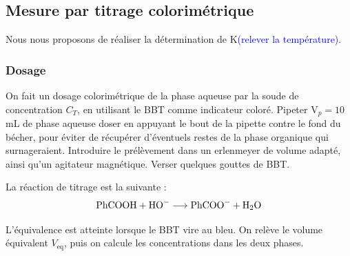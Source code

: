 \documentclass[11pt,a4paper]{report}
\begin{document}
\subsection{Mesure par titrage colorimétrique}

Nous nous proposons de réaliser la détermination de K\degree \textcolor{blue}{(relever la température)}.

\subsubsection*{Dosage}

On fait un dosage colorimétrique de la phase aqueuse par la soude de concentration $C_T$, en utilisant le BBT comme indicateur coloré. Pipeter $\text{V}_p = 10$ mL de phase aqueuse doser en appuyant le bout de la pipette contre le fond du bécher, pour éviter de récupérer d'éventuels restes de la phase organique qui surnageraient. Introduire le prélèvement dans un erlenmeyer de volume adapté, ainsi qu'un agitateur magnétique. Verser quelques gouttes de BBT.

La réaction de titrage est la suivante :
\begin{equation}
	\text{\text{PhCOOH}} + \text{HO}^- \longrightarrow \text{PhCOO}^- + \text{H}_2\text{O}
\end{equation}

L'équivalence est atteinte lorsque le BBT vire au bleu. On relève le volume équivalent $V_\text{eq}$, puis on calcule les concentrations dans les deux phases.
\end{document}
